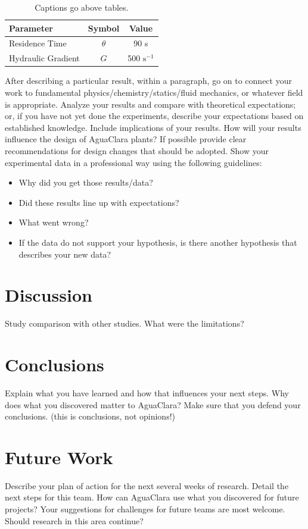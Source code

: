 \documentclass[a4paper]{article}
\begin{document}
\begin{table}[H]
	\centering
	\caption{Captions go above tables.}
	\begin{tabular}{| l | c | c |}
		\hline
		Parameter          & Symbol   & Value                 \\ \hline
		Residence Time     & $\theta$ & 90 s                  \\ \hline
		Hydraulic Gradient & $G$      & 500 $\mathrm{s^{-1}}$ \\
		\hline
	\end{tabular}
	\label{Table}
\end{table}

After describing a particular result, within a paragraph, go on to connect your work to fundamental physics/chemistry/statics/fluid mechanics, or whatever field is appropriate. Analyze your results and compare with theoretical expectations; or, if you have not yet done the experiments, describe your expectations based on established knowledge. Include implications of your results. How will your results influence the design of AguaClara plants? If possible provide clear recommendations for design changes that should be adopted. Show your experimental data in a professional way using the following guidelines:
\begin{itemize}
	\item Why did you get those results/data?
	\item Did these results line up with expectations?
	\item What went wrong?
	\item If the data do not support your hypothesis, is there another hypothesis that describes your new data?
\end{itemize}

\section*{Discussion}
Study comparison with other studies. What were the limitations?

\section*{Conclusions}
Explain what you have learned and how that influences your next steps. Why does what you discovered matter to AguaClara?
Make sure that you defend your conclusions. (this is conclusions, not opinions!)

\section*{Future Work}
Describe your plan of action for the next several weeks of research. Detail the next steps for this team. How can AguaClara use what you discovered for future projects? Your suggestions for challenges for future teams are most welcome. Should research in this area continue?



\end{document}
